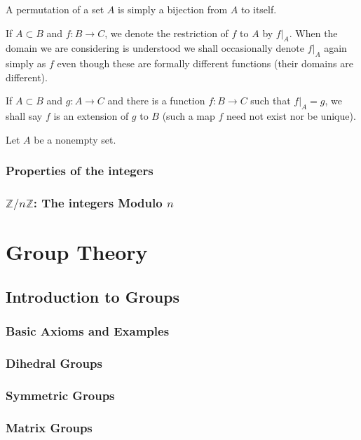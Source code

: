 \documentclass[cn,11pt,chinese]{elegantbook}
\numberwithin{equation}{section}
\begin{document}
A permutation of a set $A$ is simply a bijection from $A$ to itself.

If $A \subset B$ and $f: B \to C$, we denote the restriction of $f$ to $A$ by $f|_A$. When the domain we are  considering is understood we shall occasionally denote $f|_A$ again simply as $f$ even though these are formally different functions (their domains are different).

If $A \subset B$ and $g: A \to C$ and there is a function $f: B \to C$ such that $f|_A = g$, we shall say $f$ is an extension of $g$ to $B$ (such a map $f$ need not exist nor be unique).

Let $A$ be a nonempty set.

\section{Properties of the integers}\label{section00002}



\section{$\mathbb{Z}/n\mathbb{Z}$: The integers Modulo $n$}\label{section00003}


\part{Group Theory}
\chapter{Introduction to Groups}\label{chapter001}
\section{Basic Axioms and Examples}\label{section00101}


\section{Dihedral Groups}\label{section00102}



\section{Symmetric Groups}\label{section00103}



\section{Matrix Groups}\label{section00104}
\end{document}
